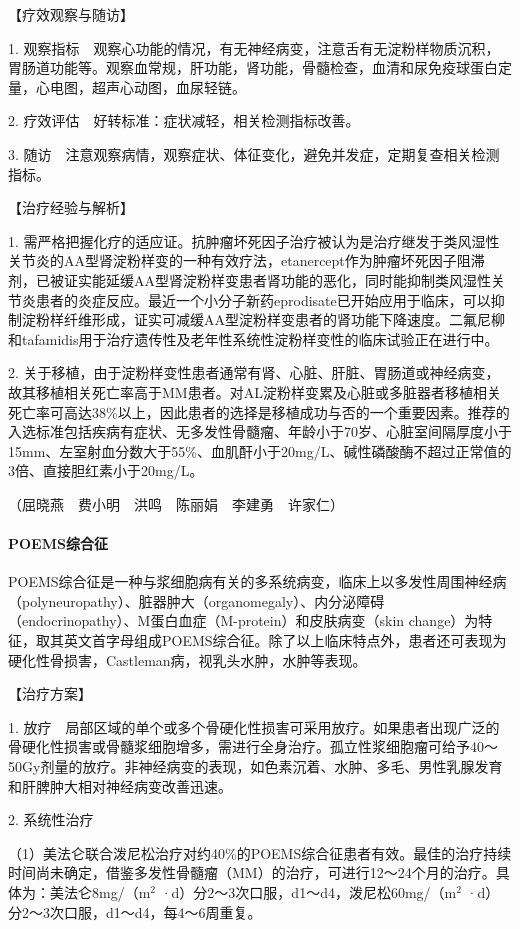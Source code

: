 【疗效观察与随访】

1.
观察指标　观察心功能的情况，有无神经病变，注意舌有无淀粉样物质沉积，胃肠道功能等。观察血常规，肝功能，肾功能，骨髓检查，血清和尿免疫球蛋白定量，心电图，超声心动图，血尿轻链。

2. 疗效评估　好转标准：症状减轻，相关检测指标改善。

3.
随访　注意观察病情，观察症状、体征变化，避免并发症，定期复查相关检测指标。

【治疗经验与解析】

1.
需严格把握化疗的适应证。抗肿瘤坏死因子治疗被认为是治疗继发于类风湿性关节炎的AA型肾淀粉样变的一种有效疗法，etanercept作为肿瘤坏死因子阻滞剂，已被证实能延缓AA型肾淀粉样变患者肾功能的恶化，同时能抑制类风湿性关节炎患者的炎症反应。最近一个小分子新药eprodisate已开始应用于临床，可以抑制淀粉样纤维形成，证实可减缓AA型淀粉样变患者的肾功能下降速度。二氟尼柳和tafamidis用于治疗遗传性及老年性系统性淀粉样变性的临床试验正在进行中。

2.
关于移植，由于淀粉样变性患者通常有肾、心脏、肝脏、胃肠道或神经病变，故其移植相关死亡率高于MM患者。对AL淀粉样变累及心脏或多脏器者移植相关死亡率可高达38\%以上，因此患者的选择是移植成功与否的一个重要因素。推荐的入选标准包括疾病有症状、无多发性骨髓瘤、年龄小于70岁、心脏室间隔厚度小于15mm、左室射血分数大于55\%、血肌酐小于20mg/L、碱性磷酸酶不超过正常值的3倍、直接胆红素小于20mg/L。

（屈晓燕　费小明　洪鸣　陈丽娟　李建勇　许家仁）

\paragraph{POEMS综合征}

POEMS综合征是一种与浆细胞病有关的多系统病变，临床上以多发性周围神经病（polyneuropathy）、脏器肿大（organomegaly）、内分泌障碍（endocrinopathy）、M蛋白血症（M-protein）和皮肤病变（skin
change）为特征，取其英文首字母组成POEMS综合征。除了以上临床特点外，患者还可表现为硬化性骨损害，Castleman病，视乳头水肿，水肿等表现。

【治疗方案】

1.
放疗　局部区域的单个或多个骨硬化性损害可采用放疗。如果患者出现广泛的骨硬化性损害或骨髓浆细胞增多，需进行全身治疗。孤立性浆细胞瘤可给予40～50Gy剂量的放疗。非神经病变的表现，如色素沉着、水肿、多毛、男性乳腺发育和肝脾肿大相对神经病变改善迅速。

2. 系统性治疗

（1）美法仑联合泼尼松治疗对约40\%的POEMS综合征患者有效。最佳的治疗持续时间尚未确定，借鉴多发性骨髓瘤（MM）的治疗，可进行12～24个月的治疗。具体为：美法仑8mg/（m$^2$
·d）分2～3次口服，d1～d4，泼尼松60mg/（m$^2$
·d）分2～3次口服，d1～d4，每4～6周重复。

